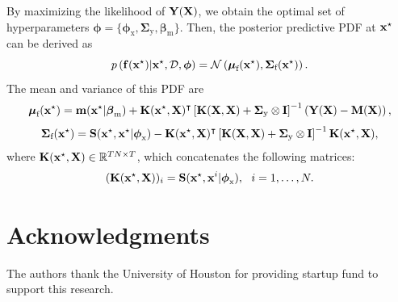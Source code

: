 \documentclass[journal ]{new-aiaa}
\begin{document}
By maximizing the likelihood of ${\bf Y}({\bf X})$, we obtain the optimal set of hyperparameters $\boldsymbol \phi=\{\boldsymbol \phi_{\text{x}},\boldsymbol{\Sigma}_\text{y},\boldsymbol \beta_{\text{m}}\}$.
Then, the posterior predictive PDF at ${\bf x}^\star$ can be derived as
\begin{equation}\label{eqnB4}
	p\left({\bf f}({\bf x}^\star)|{\bf x}^\star,\mathcal{D},\boldsymbol \phi\right) = \mathcal{N}\left(\boldsymbol{\mu}_\text{f}({\bf x}^\star),\boldsymbol{\Sigma}_\text{f}({\bf x}^\star)\right).
\end{equation}
The mean and variance of this PDF are
\begin{equation}\label{eqnB5}
		\boldsymbol{\mu}_\text{f}({\bf x}^\star)={\bf m}({\bf x}^\star|\boldsymbol \beta_{\text{m}})
		+ {\bf K}({\bf x}^\star,{\bf X})^\intercal \left[ {\bf K}({\bf X},{\bf X})+\boldsymbol{\Sigma}_\text{y} \otimes {\bf I}\right]^{-1} \left({\bf Y}({\bf X})-{\bf M} ({\bf X})\right),
\end{equation}
\begin{equation}\label{eqnB6}
		\boldsymbol{\Sigma}_\text{f}({\bf x}^\star)={\bf S}({\bf x}^\star,{\bf x}^\star|\boldsymbol \phi_{\text{x}})
		-{\bf K}({\bf x}^\star,{\bf X})^\intercal \left[ {\bf K}({\bf X},{\bf X})+\boldsymbol{\Sigma}_\text{y} \otimes {\bf I}\right]^{-1} {\bf K}({\bf x}^\star,{\bf X}),
\end{equation}
where ${\bf K}({\bf x}^\star,{\bf X}) \in \mathbb{R}^{TN \times T}$, which concatenates the following matrices:
\begin{equation}\label{eqnB7}
	({\bf K}({\bf x}^\star,{\bf X}))_i = {\bf S}({\bf x}^\star,{\bf x}^i|\boldsymbol \phi_{\text{x}}), \ \ i=1,\dots,N.
\end{equation}

\section*{Acknowledgments}
The authors thank the University of Houston for providing startup fund to support this research.

\clearpage

\end{document}
